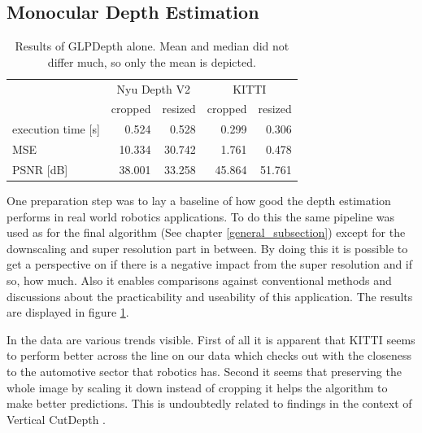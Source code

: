 \subsection{Monocular Depth Estimation}

\begin{table}[ht!]
    \begin{center}
        \begin{tabular}{ l | r r r r }
                                & \multicolumn{2}{c}{Nyu Depth V2}  & \multicolumn{2}{c}{KITTI} \\
                                & cropped   & resized               & cropped   & resized       \\
            \hline
            execution time [s]  & 0.524     & 0.528                 & 0.299     & 0.306         \\
            MSE                 & 10.334    & 30.742                & 1.761     & 0.478         \\
            PSNR [dB]           & 38.001    & 33.258                & 45.864    & 51.761        \\
        \end{tabular}
        \caption{Results of GLPDepth alone. Mean and median did not differ much, so only the mean is depicted.} \label{res_glpdepth}
    \end{center}
\end{table}

One preparation step was to lay a baseline of how good the depth estimation performs in real world robotics applications. To do this the same pipeline was used as for the final algorithm (See chapter \ref*{general_subsection}) except for the downscaling and super resolution part in between. By doing this it is possible to get a perspective on if there is a negative impact from the super resolution and if so, how much. Also it enables comparisons against conventional methods and discussions about the practicability and useability of this application. The results are displayed in figure \ref*{res_glpdepth}.

In the data are various trends visible. First of all it is apparent that KITTI seems to perform better across the line on our data which checks out with the closeness to the automotive sector that robotics has. Second it seems that preserving the whole image by scaling it down instead of cropping it helps the algorithm to make better predictions. This is undoubtedly related to findings in the context of Vertical CutDepth \cite{ishii}.

